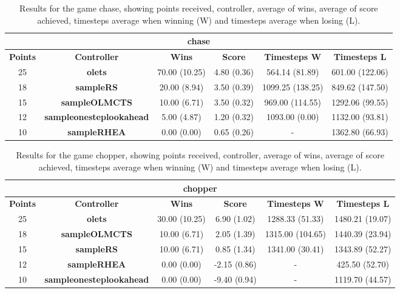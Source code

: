 \begin{table*}[!t]
\begin{center}
\begin{tabular}{|c|c|c|c|c|c|}
\multicolumn{6}{c}{\textbf{chase}}\\
\hline
\textbf{Points} & \textbf{Controller} & \textbf{Wins} &  \textbf{Score} & \textbf{Timesteps W} & \textbf{Timesteps L}\\
\hline
25 & \textbf{olets} & 70.00 (10.25) & 4.80 (0.36) & 564.14 (81.89) & 601.00 (122.06)
 \\
\hline
18 & \textbf{sampleRS} & 20.00 (8.94) & 3.50 (0.39) & 1099.25 (138.25) & 849.62 (147.50)
 \\
\hline
15 & \textbf{sampleOLMCTS} & 10.00 (6.71) & 3.50 (0.32) & 969.00 (114.55) & 1292.06 (99.55)
 \\
\hline
12 & \textbf{sampleonesteplookahead} & 5.00 (4.87) & 1.20 (0.32) & 1093.00 (0.00) & 1132.00 (93.81)
 \\
\hline
10 & \textbf{sampleRHEA} & 0.00 (0.00) & 0.65 (0.26) &  -  & 1362.80 (66.93)
 \\
\hline
\end{tabular}
\caption{Results for the game chase, showing points received, controller, average of wins, average of score achieved, timesteps average when winning (W) and timesteps average when losing (L).}
\label{tab:weights}
\end{center}
\end{table*}
\begin{table*}[!t]
\begin{center}
\begin{tabular}{|c|c|c|c|c|c|}
\multicolumn{6}{c}{\textbf{chopper}}\\
\hline
\textbf{Points} & \textbf{Controller} & \textbf{Wins} &  \textbf{Score} & \textbf{Timesteps W} & \textbf{Timesteps L}\\
\hline
25 & \textbf{olets} & 30.00 (10.25) & 6.90 (1.02) & 1288.33 (51.33) & 1480.21 (19.07)
 \\
\hline
18 & \textbf{sampleOLMCTS} & 10.00 (6.71) & 2.05 (1.39) & 1315.00 (104.65) & 1440.39 (23.94)
 \\
\hline
15 & \textbf{sampleRS} & 10.00 (6.71) & 0.85 (1.34) & 1341.00 (30.41) & 1343.89 (52.27)
 \\
\hline
12 & \textbf{sampleRHEA} & 0.00 (0.00) & -2.15 (0.86) &  -  & 425.50 (52.70)
 \\
\hline
10 & \textbf{sampleonesteplookahead} & 0.00 (0.00) & -9.40 (0.94) &  -  & 1119.70 (44.57)
 \\
\hline
\end{tabular}
\caption{Results for the game chopper, showing points received, controller, average of wins, average of score achieved, timesteps average when winning (W) and timesteps average when losing (L).}
\label{tab:weights}
\end{center}
\end{table*}
